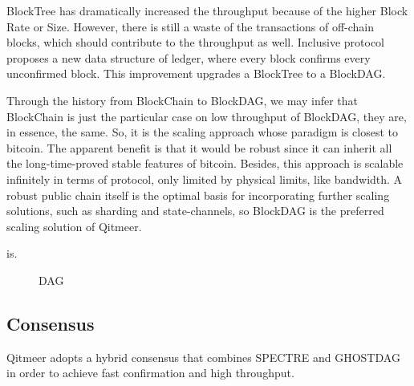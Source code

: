 \documentclass[a4paper,11pt]{article}
\begin{document}
BlockTree has dramatically increased the throughput because of the higher Block Rate or Size. However, there is still a waste of the transactions of off-chain blocks, which should contribute to the throughput as well. Inclusive protocol proposes a new data structure of ledger, where every block confirms every unconfirmed block. This improvement upgrades a BlockTree to a BlockDAG. 

Through the history from BlockChain to BlockDAG, we may infer that BlockChain is just the particular case on low throughput of BlockDAG, they are, in essence, the same. So, it is the scaling approach whose paradigm is closest to bitcoin. The apparent benefit is that it would be robust since it can inherit all the long-time-proved stable features of bitcoin. Besides, this approach is scalable infinitely in terms of protocol, only limited by physical limits, like bandwidth. A robust public chain itself is the optimal basis for incorporating further scaling solutions, such as sharding and state-channels, so BlockDAG is the preferred scaling solution of Qitmeer.

is\cite{Yonatan-high-rate-bitcoin}\cite{bitcoin-backbone}\cite{asynchronous}.

\begin{figure}[hbt]
	\centerline{%
	}
\caption{DAG}
\end{figure}

\subsection{Consensus}

Qitmeer adopts a hybrid consensus that combines SPECTRE and GHOSTDAG  in order to achieve fast confirmation and high throughput.
\end{document}
